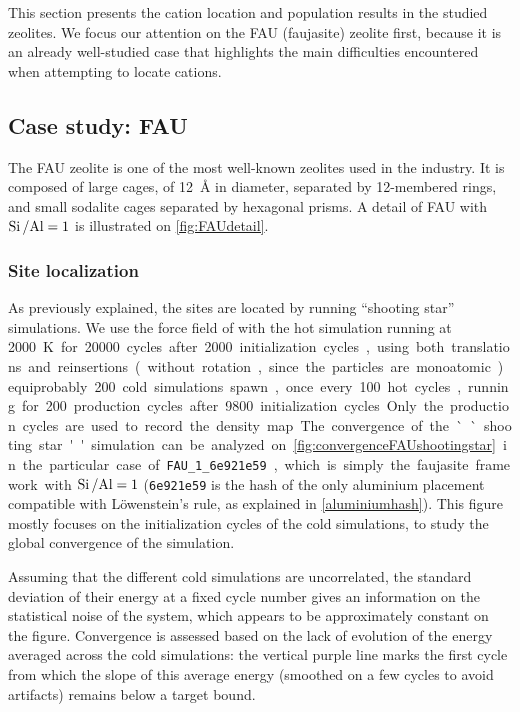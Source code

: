 \documentclass[main.tex]{subfiles}
\begin{document}
This section presents the cation location and population results in the studied zeolites. We focus our attention on the FAU (faujasite) zeolite first, because it is an already well-studied case that highlights the main difficulties encountered when attempting to locate cations.

\subsection{Case study: FAU}

\label{casestudyFAU}

The FAU zeolite is one of the most well-known zeolites used in the industry. It is composed of large cages, of \qty{12}{\angstrom} in diameter, separated by 12-membered rings, and small sodalite cages separated by hexagonal prisms. A detail of FAU with $\mbox{Si\,/Al} = 1$ is illustrated on \cref{fig:FAUdetail}.

\subsubsection{Site localization}

As previously explained, the sites are located by running ``shooting star'' simulations. We use the force field of \textcite{BoulfelfelSholl2021} with the hot simulation running at \qty{2000}K for \num{20000} cycles after \num{2000} initialization cycles, using both translations and reinsertions (without rotation, since the particles are monoatomic) equiprobably. \num{200} cold simulations spawn, once every \num{100} hot cycles, running for \num{200} production cycles after \num{9800} initialization cycles. Only the production cycles are used to record the density map.

The convergence of the ``shooting star'' simulation can be analyzed on \cref{fig:convergenceFAUshootingstar} in the particular case of \texttt{FAU\_1\_6e921e59}, which is simply the faujasite framework with $\mbox{Si\,/Al} = 1$ (\texttt{6e921e59} is the hash of the only aluminium placement compatible with L\"owenstein's rule, as explained in \cref{aluminiumhash}). This figure mostly focuses on the initialization cycles of the cold simulations, to study the global convergence of the simulation.

Assuming that the different cold simulations are uncorrelated, the standard deviation of their energy at a fixed cycle number gives an information on the statistical noise of the system, which appears to be approximately constant on the figure. Convergence is assessed based on the lack of evolution of the energy averaged across the cold simulations: the vertical purple line marks the first cycle from which the slope of this average energy (smoothed on a few cycles to avoid artifacts) remains below a target bound.
\end{document}
